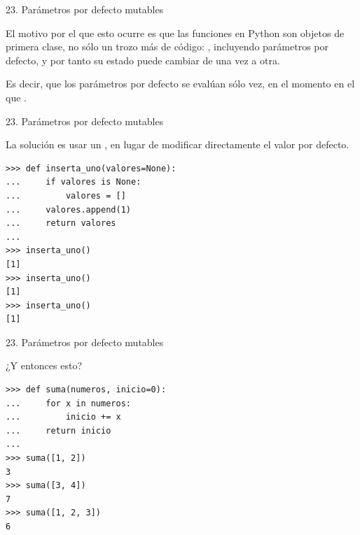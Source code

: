 \documentclass[14pt]{beamer}
\begin{document}
\begin{frame}[fragile]{23. Parámetros por defecto mutables}
  \begin{block}{}
    \centering
    \small
    El motivo por el que esto ocurre es que las funciones en Python
    son objetos de primera clase, no sólo un trozo más de código:
    , incluyendo parámetros
    por defecto, y por tanto su estado puede cambiar de una vez a
    otra.
  \end{block}

  \begin{alertblock}{}
    \centering
    Es decir, que los parámetros por defecto se evalúan sólo
     vez, en el momento en el que .
  \end{alertblock}
\end{frame}

\begin{frame}[fragile]{23. Parámetros por defecto mutables}
  \begin{block}{}
    \centering
    La solución es usar un , en
    lugar de modificar directamente el valor por defecto.
  \end{block}

  \begin{exampleblock}{}
    \footnotesize
    \begin{lstlisting}
>>> def inserta_uno(valores=None):
...     if valores is None:
...         valores = []
...     valores.append(1)
...     return valores
...
>>> inserta_uno()
[1]
>>> inserta_uno()
[1]
>>> inserta_uno()
[1]
    \end{lstlisting}
  \end{exampleblock}
\end{frame}

\begin{frame}[fragile]{23. Parámetros por defecto mutables}
  \begin{alertblock}
    \large
    \centering
    ¿Y entonces esto?
  \end{alertblock}

  \begin{exampleblock}{}
    \small
    \begin{lstlisting}
>>> def suma(numeros, inicio=0):
...     for x in numeros:
...         inicio += x
...     return inicio
...
>>> suma([1, 2])
3
>>> suma([3, 4])
7
>>> suma([1, 2, 3])
6
    \end{lstlisting}
  \end{exampleblock}
\end{frame}
\end{document}
